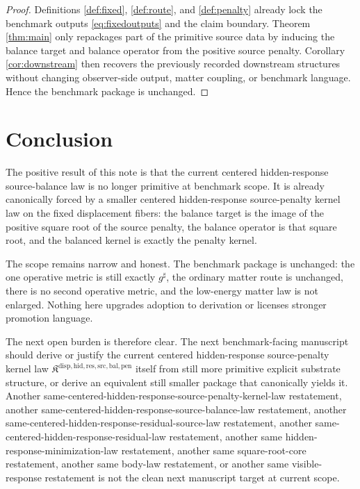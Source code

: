 \documentclass[11pt]{article}
\newcommand{\CompletedMetric}{g^{\sharp}}
\newcommand{\SourcePenaltyKernelLawPackage}{\mathfrak K^{\mathrm{disp,hid,res,src,bal,pen}}}
\begin{document}
\begin{proof}
Definitions \ref{def:fixed}, \ref{def:route}, and \ref{def:penalty} already lock the benchmark outputs \eqref{eq:fixedoutputs} and the claim boundary. Theorem \ref{thm:main} only repackages part of the primitive source data by inducing the balance target and balance operator from the positive source penalty. Corollary \ref{cor:downstream} then recovers the previously recorded downstream structures without changing observer-side output, matter coupling, or benchmark language. Hence the benchmark package is unchanged.
\end{proof}

\section{Conclusion}

The positive result of this note is that the current centered hidden-response source-balance law is no longer primitive at benchmark scope. It is already canonically forced by a smaller centered hidden-response source-penalty kernel law on the fixed displacement fibers: the balance target is the image of the positive square root of the source penalty, the balance operator is that square root, and the balanced kernel is exactly the penalty kernel.

The scope remains narrow and honest. The benchmark package is unchanged: the one operative metric is still exactly \(\CompletedMetric\), the ordinary matter route is unchanged, there is no second operative metric, and the low-energy matter law is not enlarged. Nothing here upgrades adoption to derivation or licenses stronger promotion language.

The next open burden is therefore clear. The next benchmark-facing manuscript should derive or justify the current centered hidden-response source-penalty kernel law \(\SourcePenaltyKernelLawPackage\) itself from still more primitive explicit substrate structure, or derive an equivalent still smaller package that canonically yields it. Another same-centered-hidden-response-source-penalty-kernel-law restatement, another same-centered-hidden-response-source-balance-law restatement, another same-centered-hidden-response-residual-source-law restatement, another same-centered-hidden-response-residual-law restatement, another same hidden-response-minimization-law restatement, another same square-root-core restatement, another same body-law restatement, or another same visible-response restatement is not the clean next manuscript target at current scope.
\end{document}
